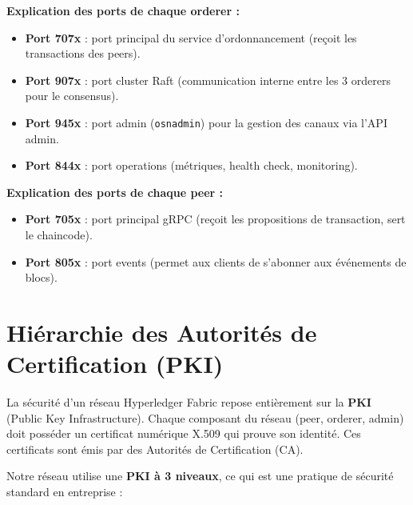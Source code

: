 \documentclass[12pt,a4paper,twoside]{report}
\begin{document}
\begin{infobox}
\textbf{Explication des ports de chaque orderer :}
\begin{itemize}
    \item \textbf{Port 707x} : port principal du service d'ordonnancement (reçoit les transactions des peers).
    \item \textbf{Port 907x} : port cluster Raft (communication interne entre les 3 orderers pour le consensus).
    \item \textbf{Port 945x} : port admin (\texttt{osnadmin}) pour la gestion des canaux via l'API admin.
    \item \textbf{Port 844x} : port operations (métriques, health check, monitoring).
\end{itemize}

\textbf{Explication des ports de chaque peer :}
\begin{itemize}
    \item \textbf{Port 705x} : port principal gRPC (reçoit les propositions de transaction, sert le chaincode).
    \item \textbf{Port 805x} : port events (permet aux clients de s'abonner aux événements de blocs).
\end{itemize}
\end{infobox}

\section{Hiérarchie des Autorités de Certification (PKI)} \label{sec:pki}

La sécurité d'un réseau Hyperledger Fabric repose entièrement sur la \textbf{PKI} (Public Key Infrastructure). Chaque composant du réseau (peer, orderer, admin) doit posséder un certificat numérique X.509 qui prouve son identité. Ces certificats sont émis par des Autorités de Certification (CA).

Notre réseau utilise une \textbf{PKI à 3 niveaux}, ce qui est une pratique de sécurité standard en entreprise :
\end{document}
